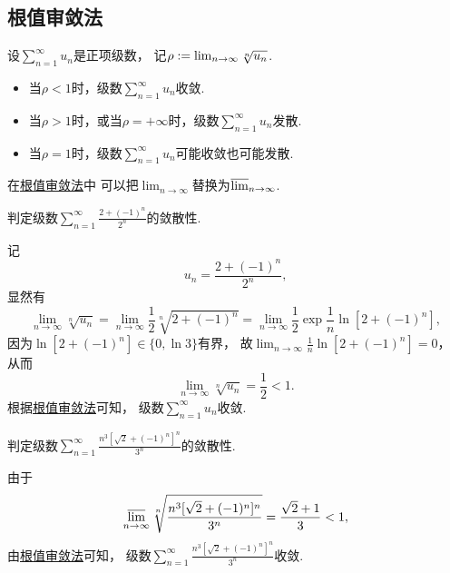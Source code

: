 \subsection{根值审敛法}
\begin{theorem}\label{theorem:无穷级数.正项级数的根值审敛法}
设\(\sum_{n=1}^\infty u_n\)是正项级数，
记\(\rho := \lim_{n\to\infty} \sqrt[n]{u_n}\).
\begin{itemize}
	\item 当\(\rho<1\)时，级数\(\sum_{n=1}^\infty u_n\)收敛.
	\item 当\(\rho>1\)时，或当\(\rho=+\infty\)时，级数\(\sum_{n=1}^\infty u_n\)发散.
	\item 当\(\rho=1\)时，级数\(\sum_{n=1}^\infty u_n\)可能收敛也可能发散.
\end{itemize}
\end{theorem}
在\hyperref[theorem:无穷级数.正项级数的根值审敛法]{根值审敛法}中
可以把\(\lim_{n\to\infty}\)替换为\(\varlimsup_{n\to\infty}\).

\begin{example}
判定级数\(\sum_{n=1}^\infty \frac{2+(-1)^n}{2^n}\)的敛散性.
\begin{solution}
记\[
	u_n = \frac{2+(-1)^n}{2^n},
\]
显然有\[
	\lim_{n\to\infty} \sqrt[n]{u_n}
	= \lim_{n\to\infty} \frac{1}{2} \sqrt[n]{2+(-1)^n}
	= \lim_{n\to\infty} \frac{1}{2} \exp{\frac{1}{n} \ln[2+(-1)^n]},
\]
因为\(\ln[2+(-1)^n] \in \{ 0, \ln3 \}\)有界，
故\(\lim_{n\to\infty} \frac{1}{n} \ln[2+(-1)^n] = 0\)，
从而\[
	\lim_{n\to\infty} \sqrt[n]{u_n} = \frac{1}{2} < 1.
\]
根据\hyperref[theorem:无穷级数.正项级数的根值审敛法]{根值审敛法}可知，
级数\(\sum_{n=1}^\infty u_n\)收敛.
\end{solution}
\end{example}

\begin{example}
判定级数\(\sum_{n=1}^\infty \frac{n^3[\sqrt2 + (-1)^n]^n}{3^n}\)的敛散性.
\begin{solution}
由于\[
	\varlimsup_{n\to\infty} \sqrt[n]{
		\frac{n^3[\sqrt2 + (-1)^n]^n}{3^n}
	}
	= \frac{\sqrt2+1}3
	< 1,
\]
由\hyperref[theorem:无穷级数.正项级数的根值审敛法]{根值审敛法}可知，
级数\(\sum_{n=1}^\infty \frac{n^3[\sqrt2 + (-1)^n]^n}{3^n}\)收敛.
\end{solution}
\end{example}

